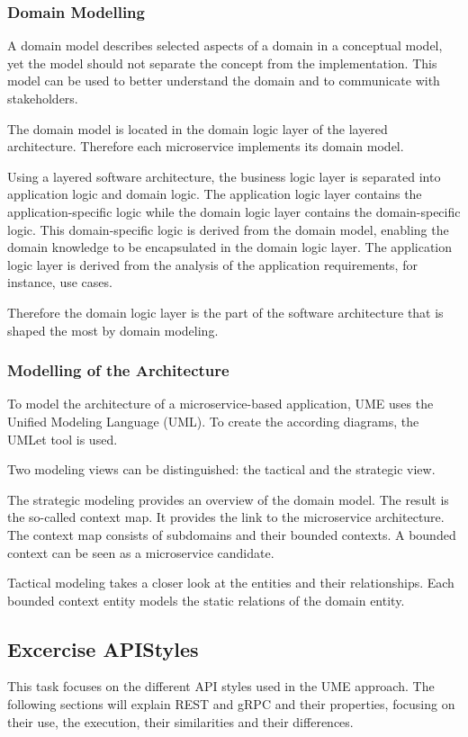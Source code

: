 \subsubsection*{Domain Modelling}
A domain model describes selected aspects of a domain in a conceptual model, yet the model should not separate the concept from the implementation.
This model can be used to better understand the domain and to communicate with stakeholders.

The domain model is located in the domain logic layer of the layered architecture.
Therefore each microservice implements its domain model.

Using a layered software architecture, the business logic layer is separated into application logic and domain logic.
The application logic layer contains the application-specific logic while the domain logic layer contains the domain-specific logic.
This domain-specific logic is derived from the domain model, enabling the domain knowledge to be encapsulated in the domain logic layer.
The application logic layer is derived from the analysis of the application requirements, for instance, use cases.

Therefore the domain logic layer is the part of the software architecture that is shaped the most by domain modeling.

\subsubsection*{Modelling of the Architecture}
To model the architecture of a microservice-based application, UME uses the Unified Modeling Language (UML).
To create the according diagrams, the UMLet tool is used.

Two modeling views can be distinguished: the tactical and the strategic view.

The strategic modeling provides an overview of the domain model.
The result is the so-called context map.
It provides the link to the microservice architecture.
The context map consists of subdomains and their bounded contexts.
A bounded context can be seen as a microservice candidate.

Tactical modeling takes a closer look at the entities and their relationships.
Each bounded context entity models the static relations of the domain entity.

\subsection{Excercise APIStyles}
\label{sec:api_styles}
This task focuses on the different API styles used in the UME approach.
The following sections will explain REST and gRPC and their properties, focusing on their use, the execution, their similarities and their differences.

